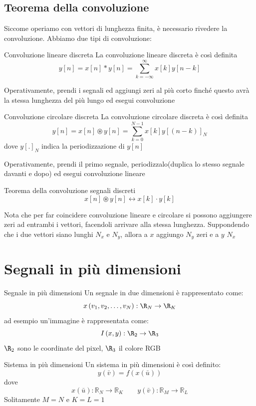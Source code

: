 \subsection{Teorema della convoluzione}
Siccome operiamo con vettori di lunghezza finita, è necessario rivedere la convoluzione. Abbiamo due tipi di convoluzione:
\begin{definizione}{Convoluzione lineare discreta}
	La convoluzione lineare discreta è così definita
	\[
		y[n] = x[n] * y[n] = \sum_{k=-\infty}^{\infty} x[k] y[n-k]
	\]
\end{definizione}
Operativamente, prendi i segnali ed aggiungi zeri al più corto finché questo avrà la stessa lunghezza del più lungo ed esegui convoluzione
\begin{definizione}{Convoluzione circolare discreta}
	La convoluzione circolare discreta è così definita
	\[
		y[n] = x[n] \circledast y[n] = \sum_{k=0}^{N-1} x[k] y[(n-k)]_N
	\]
	dove $ y\left[.\right]_N $ indica la periodizzazione di $ y[n] $
\end{definizione}
Operativamente, prendi il primo segnale, periodizzalo(duplica lo stesso segnale davanti e dopo) ed esegui convoluzione lineare
\begin{teorema}{Teorema della convoluzione segnali discreti}
	\[
		x[n] \circledast y[n] \leftrightarrow x[k] \cdot  y[k]
	\]
\end{teorema}
Nota che per far coincidere convoluzione lineare e circolare si possono aggiungere zeri ad entrambi i vettori, facendoli arrivare alla stessa lunghezza.
\vskip3mm
Suppondendo che i due vettori siano lunghi $ N_x $ e $ N_y $, allora a $ x $ aggiungo $ N_y $ zeri e a $ y $ $ N_x $
\section{Segnali in più dimensioni}
\begin{definizione}{Segnale in più dimensioni}
	Un segnale in due dimensioni è rappresentato come:
	\[
		x\left(v_1,v_2,\ldots , v_N\right): \R_N \to \R_K
	\]
	ad esempio un'immagine è rappresentata come:
	\[
		I\left(x,y\right): \R_2 \to  \R_3
	\]
	$ \R_2 $ sono le coordinate del pixel, $ \R_3 $ il colore RGB
\end{definizione}

\begin{definizione}{Sistema in più dimensioni}
	Un sistema in più dimensioni è così definito:
	\[
		y(\bar{v})=f(x(\bar{u}))
	\]
	dove
	\[
		x(\bar{u}): \mathbb{R}_N \rightarrow \mathbb{R}_K \quad \quad  y(\bar{v}): \mathbb{R}_M \rightarrow \mathbb{R}_L
	\]
	Solitamente $ M=N $ e $ K=L=1 $
\end{definizione}
